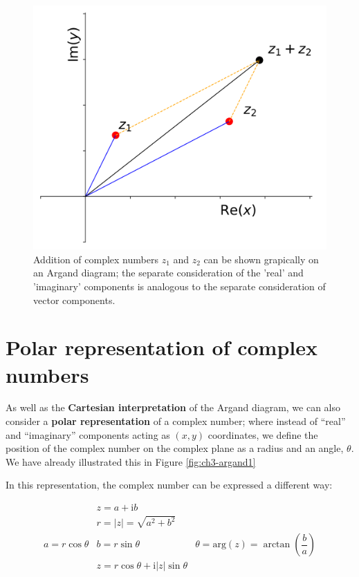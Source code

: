 \documentclass[
]{book}
\begin{document}
\begin{figure}

{\centering \includegraphics[width=0.7\linewidth]{visualisations/ch3-complexnumbers2} 

}

\caption{Addition of complex numbers $z_1$ and $z_2$ can be shown grapically on an Argand diagram; the separate consideration of the 'real' and 'imaginary' components is analogous to the separate consideration of vector components.}\label{fig:ch3-argandcomplexaddition1}
\end{figure}

\hypertarget{sec-ch3-polarcomplexnumbers}{%
\section{Polar representation of complex numbers}\label{sec-ch3-polarcomplexnumbers}}

As well as the \textbf{Cartesian interpretation} of the Argand diagram, we can also consider a \textbf{polar representation} of a complex number; where instead of ``real'' and ``imaginary'' components acting as \((x,y)\) coordinates, we define the position of the complex number on the complex plane as a radius and an angle, \(\theta\). We have already illustrated this in Figure \ref{fig:ch3-argand1}

In this representation, the complex number can be expressed a different way:

\begin{equation}
\begin{array}{rcl}
& z = a + \mathrm{i}b & \\
& r = |z| = \sqrt{a^2 + b^2} & \\
a = r\cos \theta & b = r \sin \theta & \theta = \mathrm{arg} (z) = \arctan \left( \dfrac{b}{a} \right) \\
& z = r \cos \theta + \mathrm{i}|z| \sin \theta &
\end{array}
\end{equation}
\end{document}
